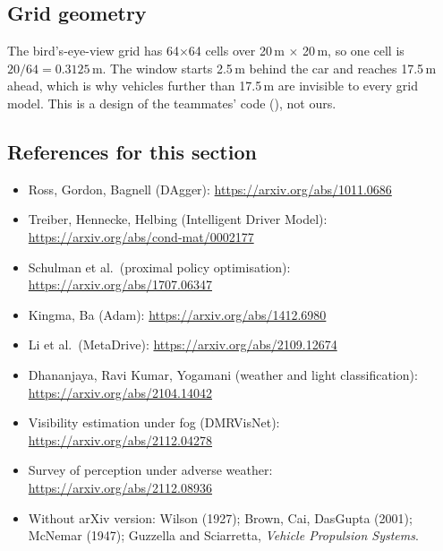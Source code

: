 \subsection{Grid geometry}
The bird's-eye-view grid has 64$\times$64 cells over 20\,m $\times$ 20\,m, so one cell is $20/64=0.3125$\,m. The window starts 2.5\,m behind the car and reaches 17.5\,m ahead, which is why vehicles further than 17.5\,m are invisible to every grid model. This is a design of the teammates' code (), not ours.

\subsection{References for this section}
\begin{itemize}[itemsep=1pt]
\item Ross, Gordon, Bagnell (DAgger): \url{https://arxiv.org/abs/1011.0686}
\item Treiber, Hennecke, Helbing (Intelligent Driver Model): \url{https://arxiv.org/abs/cond-mat/0002177}
\item Schulman et al.\ (proximal policy optimisation): \url{https://arxiv.org/abs/1707.06347}
\item Kingma, Ba (Adam): \url{https://arxiv.org/abs/1412.6980}
\item Li et al.\ (MetaDrive): \url{https://arxiv.org/abs/2109.12674}
\item Dhananjaya, Ravi Kumar, Yogamani (weather and light classification): \url{https://arxiv.org/abs/2104.14042}
\item Visibility estimation under fog (DMRVisNet): \url{https://arxiv.org/abs/2112.04278}
\item Survey of perception under adverse weather: \url{https://arxiv.org/abs/2112.08936}
\item Without arXiv version: Wilson (1927); Brown, Cai, DasGupta (2001); McNemar (1947); Guzzella and Sciarretta, \emph{Vehicle Propulsion Systems}.
\end{itemize}
